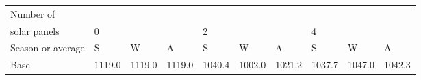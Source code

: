 \begin{table}[h] 
\centering 
\begin{tabular}{l|lll|lll|lll}Number of \\ solar panels&0& & &2& & &4& & \\ \hline 
Season or average & S & W & A & S & W & A & S & W & A \\ \hline 
Base&1119.0&1119.0&1119.0&1040.4&1002.0&1021.2&1037.7&1047.0&1042.3 \\ 
\end{tabular} 
\end{table}